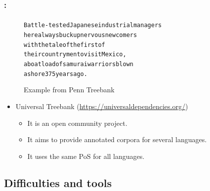 \documentclass[xcolor=table]{beamer}
\begin{document}
\begin{frame}[fragile]
	\frametitle{\insertshortsubtitle: \insertsection}
	\framesubtitle{\insertsubsection}
	
	\vspace{-8pt}
	\begin{figure}
		\begin{tcolorbox}[colback=white, colframe=blue, boxrule=1pt, text width=.9\textwidth]
			\small
	\begin{alltt}
	Battle-tested Japanese industrial managers
	here always buck up nervous newcomers
	with the tale of the first of
	their countrymen to visit Mexico ,\keyword{/,}
	a boatload of samurai warriors blown
	ashore 375 years ago .
	\end{alltt}\vspace{-6pt}
	\end{tcolorbox}
	\caption{Example from Penn Treebank \cite{2003-taylor}}
	\end{figure}
	
	\begin{itemize}
		\item Universal Treebank (\url{https://universaldependencies.org/}) \cite{2012-petrov-al}
		\begin{itemize}
			\item It is an open community project.
			\item It aims to provide annotated corpora for several languages.
			\item It uses the same PoS for all languages.
		\end{itemize}
	\end{itemize}

\end{frame}

\subsection{Difficulties and tools}
\end{document}
